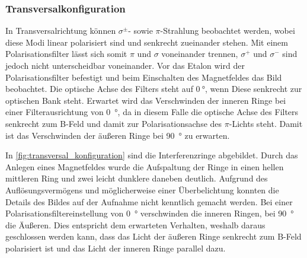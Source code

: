 \subsubsection{Transversalkonfiguration}
In Transversalrichtung können $\sigma^\pm$- sowie $\pi$-Strahlung beobachtet werden, wobei 
diese Modi linear polarisiert sind und senkrecht zueinander stehen. Mit einem Polarisationsfilter 
lässt sich somit $\pi$ und $\sigma$ voneinander trennen, $\sigma^+$ und $\sigma^-$ sind jedoch nicht 
unterscheidbar voneinander. Vor das Etalon wird der Polarisationsfilter befestigt und 
beim Einschalten des Magnetfeldes das Bild beobachtet. Die optische Achse 
des Filters steht auf $\SI{0}{\degree}$, wenn Diese senkrecht zur optischen Bank
steht. Erwartet wird das Verschwinden der inneren Ringe bei einer Filterausrichtung von 
\SI{0}{\degree}, da in diesem Falle die optische Achse des Filters senkrecht zum B-Feld und damit 
zur Polarisationsachse des $\pi$-Lichts steht. Damit ist das Verschwinden der äußeren Ringe 
bei \SI{90}{\degree} zu erwarten.

In \cref{fig:transversal_konfiguration} sind die Interferenzringe abgebildet. Durch das Anlegen
eines Magnetfeldes wurde die Aufspaltung der Ringe in einen hellen mittleren 
Ring und zwei leicht dunklere daneben deutlich. Aufgrund des Auflösungsvermögens und möglicherweise 
einer Überbelichtung konnten die Details des Bildes auf der Aufnahme nicht kenntlich
gemacht werden. Bei einer Polarisationsfiltereinstellung von \SI{0}{\degree} verschwinden
die inneren Ringen, bei \SI{90}{\degree} die Äußeren. Dies entspricht dem erwarteten Verhalten, 
weshalb daraus geschlossen werden kann, dass das Licht der äußeren Ringe senkrecht zum 
B-Feld polarisiert ist und das Licht der inneren Ringe parallel dazu.



